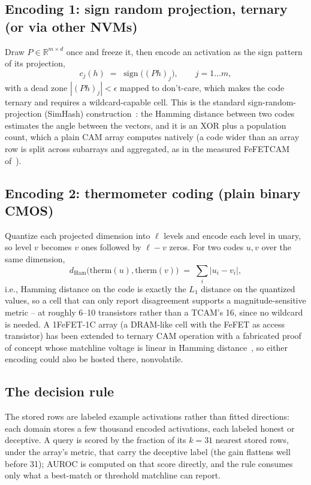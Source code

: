 \documentclass[conference]{IEEEtran}
\newcommand{\cam}{{CAM}\xspace}
\newcommand{\tcam}{{TCAM}\xspace}
\newcommand{\fefet}{{FeFET}\xspace}
\newcommand{\auroc}{{AUROC}\xspace}
\begin{document}
\subsection{Encoding 1: sign random projection, ternary (or via other
NVMs)}
\label{subsec:SignRP}
Draw $P \in \mathbb{R}^{m \times d}$ once and freeze it, then encode
an activation as the sign pattern of its projection,
%
\begin{equation}
c_j(h) \;=\; \operatorname{sign}\!\big( (Ph)_j \big), \qquad j = 1 \ldots m,
\label{eq:signrp}
\end{equation}
%
with a dead zone $|(Ph)_j| < \epsilon$ mapped to don't-care, which
makes the code ternary and requires a wildcard-capable cell. This is
the standard sign-random-projection (SimHash)
construction~\cite{charikar2002simhash}: the Hamming distance between
two codes estimates the angle between the vectors, and it is an XOR
plus a population count, which a plain \cam array computes natively
(a code wider than an array row is split across subarrays and
aggregated, as in the measured \fefet \cam
of~\cite{kazemi2022hdcfefet}).

\subsection{Encoding 2: thermometer coding (plain binary CMOS)}
\label{subsec:Thermometer}
Quantize each projected dimension into $\ell$ levels and encode each
level in unary, so level $v$ becomes $v$ ones followed by $\ell-v$
zeros. For two codes $u,v$ over the same dimension,
%
\begin{equation}
d_{\mathrm{Ham}}\big(\mathrm{therm}(u), \mathrm{therm}(v)\big)
\;=\; \sum_i \big| u_i - v_i \big|,
\label{eq:thermo}
\end{equation}
%
i.e., Hamming distance on the code is exactly the $L_1$ distance on
the quantized values, so a cell that can only report disagreement
supports a magnitude-sensitive metric -- at roughly 6--10 transistors
rather than a \tcam's 16, since no wildcard is needed. A
1\fefet-1C array (a DRAM-like cell with the \fefet as access
transistor) has been extended to ternary \cam operation with a
fabricated proof of concept whose matchline voltage is linear in
Hamming distance~\cite{fefet1c2026}, so either encoding could also be
hosted there, nonvolatile.

\subsection{The decision rule}
\label{subsec:Decision}
The stored rows are labeled example activations rather than fitted
directions: each domain stores a few thousand encoded activations,
each labeled honest or deceptive. A query is scored by the fraction
of its $k=31$ nearest stored rows, under the array's metric, that
carry the deceptive label (the gain flattens well before 31); \auroc
is computed on that score directly, and the rule consumes only what a
best-match or threshold matchline can report.
\end{document}
